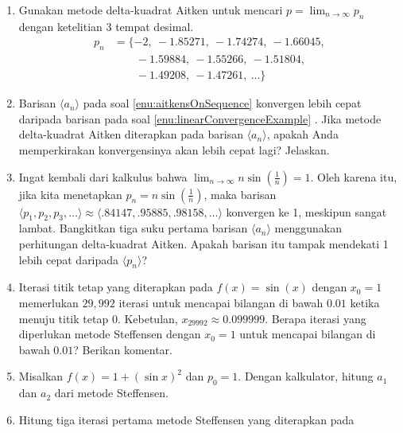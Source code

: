\begin{enumerate}
\begin{enumerate}
\item \label{exc:orderOfConvergence-6}$p_{0}=0.5$, $p_{n}=(2-e^{p_{n-1}}+p_{n-1}^{2})/3$
untuk $n\geq1$ \hasasolution 
\item $p_{0}=0.75$, $p_{n}=\sqrt{e^{p_{n-1}}/3}$ untuk $n\geq1$
\end{enumerate}
\item Gunakan metode delta-kuadrat Aitken untuk mencari ${\displaystyle p=\lim_{n\to\infty}p_{n}}$
dengan ketelitian 3 tempat desimal.
\begin{align*}
p_{n} & =\{-2,\ -1.85271,\ -1.74274,\ -1.66045,\\
 & \qquad-1.59884,\ -1.55266,\ -1.51804,\ \\
 & \qquad-1.49208,\ -1.47261,\ \ldots\}
\end{align*}
\item \label{exc:orderOfConvergence-7}Barisan $\langle a_{n}\rangle$ pada
soal \ref{enu:aitkensOnSequence} konvergen lebih cepat daripada barisan
pada soal \ref{enu:linearConvergenceExample} .
Jika metode delta-kuadrat Aitken diterapkan pada barisan $\langle a_{n}\rangle$,
apakah Anda memperkirakan konvergensinya akan lebih cepat lagi? Jelaskan. \hasananswer 
\item Ingat kembali dari kalkulus bahwa $\lim_{n\to\infty}n\sin\left(\frac{1}{n}\right)=1$.
Oleh karena itu, jika kita menetapkan $p_{n}=n\sin\left(\frac{1}{n}\right)$,
maka barisan $\langle p_{1},p_{2},p_{3},\ldots\rangle\approx\langle.84147,.95885,.98158,\ldots\rangle$
konvergen ke 1, meskipun sangat lambat. Bangkitkan tiga suku pertama
barisan $\langle a_{n}\rangle$ menggunakan perhitungan delta-kuadrat
Aitken. Apakah barisan itu tampak mendekati 1 lebih cepat daripada
$\langle p_{n}\rangle$?
\item \label{exc:orderOfConvergence-8}Iterasi titik tetap yang diterapkan
pada $f(x)=\sin(x)$ dengan $x_{0}=1$ memerlukan $29,992$ iterasi
untuk mencapai bilangan di bawah $0.01$ ketika menuju titik tetap
$0$. Kebetulan, $x_{29992}\approx0.099999$. Berapa iterasi yang
diperlukan metode Steffensen dengan $x_{0}=1$ untuk mencapai bilangan
di bawah $0.01$? Berikan komentar. \hasasolution 
\item \label{exc:orderOfConvergence-9}Misalkan $f(x)=1+(\sin x)^{2}$ dan
$p_{0}=1$. Dengan kalkulator, hitung $a_{1}$ dan $a_{2}$ dari metode
Steffensen. \hasananswer 
\item Hitung tiga iterasi pertama metode Steffensen yang diterapkan pada

\end{enumerate}
